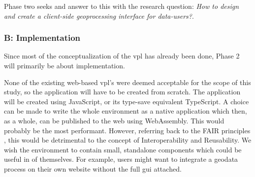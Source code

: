 Phase two seeks and answer to this with the research question: \textit{How to design and create a client-side geoprocessing interface for data-users?}. 







\subsubsection*{B: Implementation}

Since most of the conceptualization of the \ac{vpl} has already been done, Phase 2 will primarily be about implementation. 

None of the existing web-based \ac{vpl}'s were deemed acceptable for the scope of this study, so the application will have to be created from scratch. 
The application will be created using JavaScript, or its type-save equivalent TypeScript. 
A choice can be made to write the whole environment as a native application which then, as a whole, can be published to the web using WebAssembly. 
This would probably be the most performant. 
However, referring back to the FAIR principles \cite{mark_d_wilkinson_fair_2016}, this would be detrimental to the concept of Interoperability and Reusability. 
We wish the environment to contain small, standalone components which could be useful in of themselves. 
For example, users might want to integrate a geodata process on their own website without the full \ac{gui} attached.

